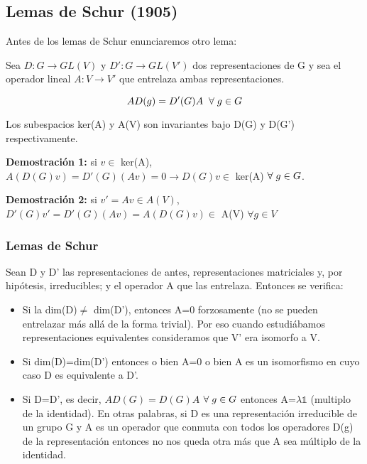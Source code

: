 \documentclass{article}
\begin{document}
    \subsection{Lemas de Schur (1905)}

    Antes de los lemas de Schur enunciaremos otro lema:

    \smallskip
    Sea $D: G\to GL(V)$ y $D': G \to GL(V')$ dos representaciones de G y sea el operador lineal $A: V\to V'$ que entrelaza ambas representaciones.

    $$AD(g)=D'(G)A \hspace{0.2cm} \forall  \hspace{0.1cm} g\in G$$

    Los subespacios ker(A) y A(V) son invariantes bajo D(G) y D(G') respectivamente.

    \smallskip
    \textbf{Demostración 1:} si $v\in$ ker(A), $A(D(G)v)=D'(G)(Av)=0\longrightarrow D(G)v\in$ ker(A) $\forall  \hspace{0.1cm} g\in G$.

    \smallskip
    \textbf{Demostración 2:} si $v'=Av\in A(V)$, $D'(G)v'=D'(G)(Av)=A(D(G)v)\in$ A(V) $\forall g\in V$

    \subsubsection{Lemas de Schur}

    Sean D y D' las representaciones de antes, representaciones matriciales y, por hipótesis, irreducibles; y el operador A que las entrelaza. Entonces se verifica:

    \begin{itemize}
        \item Si la dim(D)$\neq$ dim(D'), entonces A=0 forzosamente (no se pueden entrelazar más allá de la forma trivial). Por eso cuando estudiábamos representaciones equivalentes consideramos que V' era isomorfo a V.

        \item Si dim(D)=dim(D') entonces o bien A=0 o bien A es un isomorfismo en cuyo caso D es equivalente a D'.
        \item Si D=D', es decir, $AD(G)=D(G)A$ $\forall  \hspace{0.1cm} g\in G$ entonces A=$\lambda \mathds{1}$ (multiplo de la identidad). En otras palabras, si D es una representación irreducible de un grupo G y A es un operador que conmuta con todos los operadores D(g) de la representación entonces no nos queda otra más que A sea múltiplo de la identidad.
    \end{itemize}
\end{document}
